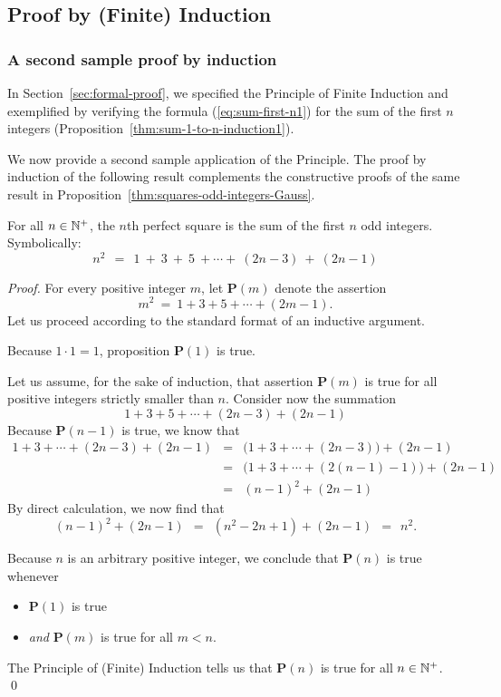 \subsection{Proof by (Finite) Induction}
\label{sec:Induction}

\subsubsection{A second sample proof by induction}

In Section~\ref{sec:formal-proof}, we specified the Principle of
Finite Induction  and
exemplified by verifying the formula (\ref{eq:sum-first-n1}) for the
sum of the first $n$ integers
(Proposition~\ref{thm:sum-1-to-n-induction1}).

We now provide a second sample application of the Principle.  The
proof by induction of the following result complements the
constructive proofs of the same result in
Proposition~\ref{thm:squares-odd-integers-Gauss}.

\begin{prop}
\label{thm:squares-odd-integers-induction1}
For all $n \in \mathbb{N}^+$, the $n$th perfect square is the sum of the first
$n$ odd integers.  Symbolically:
\[
n^2 \ \ = \ \
1 \ + \ 3 \ + \ 5 \ + \cdots + \ (2n-3) \ + \ (2n-1)
\]
\end{prop}

\begin{proof}
For every positive integer $m$, let {\bf P}$(m)$ denote the assertion
\[ m^2 \ = \ 1 + 3 + 5 + \cdots + (2m-1). \]
Let us proceed according to the standard format of an inductive
argument.

Because $1 \cdot 1 = 1$, proposition {\bf P}$(1)$ is true.

Let us assume, for the sake of induction, that assertion {\bf
  P}$(m)$ is true for all positive integers strictly smaller than $n$.
Consider now the summation
\[ 1 + 3 + 5 + \cdots + (2n-3) + (2n-1) \]
Because {\bf P}$(n-1)$ is true, we know that
\begin{eqnarray*}
1 + 3 + \cdots + (2n-3) + (2n-1)
  & = & 
\big(1 + 3 + \cdots + (2n-3) \big) + (2n-1) \\
  & = &
\big(1 + 3 + \cdots + (2(n-1) -1) \big) + (2n-1) \\
  & = & (n-1)^2 + (2n-1)
\end{eqnarray*}
By direct calculation, we now find that
\[ (n-1)^2 + (2n-1) \ \ = \ \ (n^2 -2n +1) + (2n-1) \ \ = \ \ n^2. \]

\noindent
Because $n$ is an arbitrary positive integer, we conclude that
{\bf P}$(n)$ is true whenever
\begin{itemize}
\item
{\bf P}$(1)$ is true
\item
{\em and}
{\bf P}$(m)$ is true for all $m < n$.
\end{itemize}
The Principle of (Finite) Induction tells us that {\bf P}$(n)$
is true for all $n \in \mathbb{N}^+$.  \qed
\end{proof}

